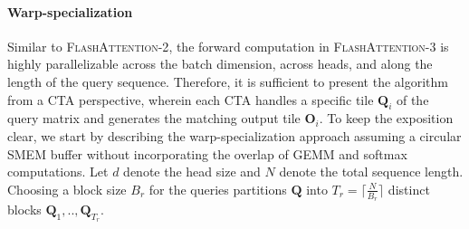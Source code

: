 \paragraph{Warp-specialization}
Similar to \textsc{FlashAttention-2}, the forward computation in \textsc{FlashAttention-3} is highly parallelizable across the batch dimension, across heads, and along the length of the query sequence. Therefore, it is sufficient to present the algorithm from a CTA perspective, wherein each CTA handles a specific tile $\mathbf{Q}_i$ of the query matrix and generates the matching output tile $\mathbf{O}_i$. To keep the exposition clear, we start by describing the warp-specialization approach assuming a circular SMEM buffer without incorporating the overlap of GEMM and softmax computations. Let $d$ denote the head size and $N$ denote the total sequence length. Choosing a block size $B_r$ for the queries partitions $\mathbf{Q}$ into $T_r = \lceil \frac{N}{B_r} \rceil$ distinct blocks $\mathbf{Q}_1, .., \mathbf{Q}_{T_r}$.

